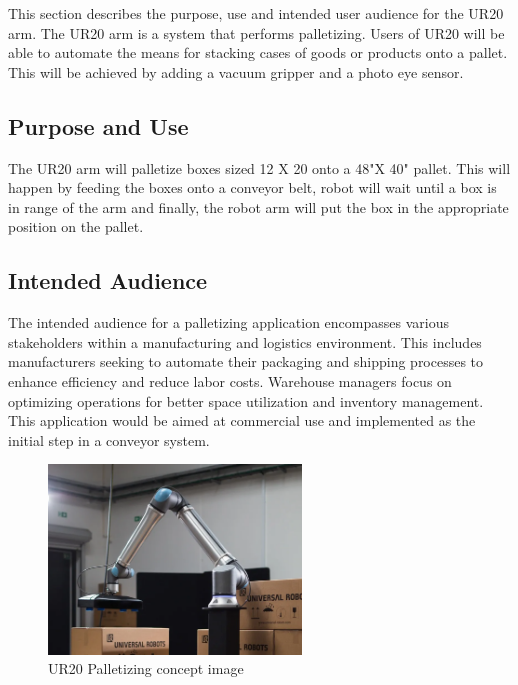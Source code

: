 This section describes the purpose, use and intended user audience for the UR20 arm. The UR20 arm is a system that performs palletizing. Users of UR20 will be able to automate the means for stacking cases of goods or products onto a pallet. This will be achieved by adding a vacuum gripper and a photo eye sensor.

\subsection{Purpose and Use}
The UR20 arm will palletize boxes sized 12 X 20 onto a 48"X 40" pallet. This will happen by feeding the boxes onto a conveyor belt, robot will wait until a box is in range of the arm and finally, the robot arm will put the box in the appropriate position on the pallet.


\subsection{Intended Audience}
The intended audience for a palletizing application encompasses various stakeholders within a manufacturing and logistics environment. This includes manufacturers seeking to automate their packaging and shipping processes to enhance efficiency and reduce labor costs. Warehouse managers focus on optimizing operations for better space utilization and inventory management. This application would be aimed at commercial use and implemented as the initial step in a conveyor system.
\begin{figure}[h!]
	\centering
   	\includegraphics[width=0.60\textwidth]{images/UR20}
    \caption{UR20 Palletizing concept image}
\end{figure}